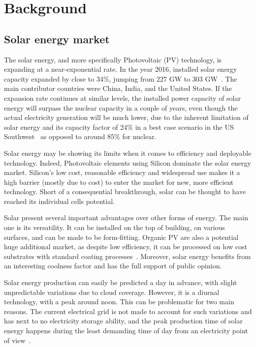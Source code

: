 \documentclass[IJPHM, 2017, 29]{PHMSociety}
\begin{document}
\section{Background}
\label{sec:bkgd}

\subsection{Solar energy market}

The solar energy, and more specifically Photovoltaic (PV) technology, is expanding at a near-exponential rate. In the year 2016, installed solar energy capacity expanded by close to 34\%, jumping from 227 GW to 303 GW~\citep{iea_solar}. The main contributor countries were China, India, and the United States. If the expansion rate continues at similar levels, the installed power capacity of solar energy will surpass the nuclear capacity in a couple of years, even though the actual electricity generation will be much lower, due to the inherent limitation of solar energy and its capacity factor of 24\% in a best case scenario in the US Southwest~\citep{solar_comp} as opposed to around 85\% for nuclear.

Solar energy may be showing its limits when it comes to efficiency and deployable technology. Indeed, Photovoltaic elements using Silicon dominate the solar energy market. Silicon's low cost, reasonable efficiency and widespread use makes it a high barrier (mostly due to cost) to enter the market for new, more efficient technology\citep{oliver1999market,van2007analysis}. Short of a consequential breakthrough, solar can be thought to have reached its individual cells potential.

Solar present several important advantages over other forms of energy. The main one is its versatility. It can be installed on the top of building, on various surfaces, and can be made to be form-fitting. Organic PV are also a potential huge additional market, as despite low efficiency, it can be processed on low cost substrates with standard coating processes~\citep{kalowekamo2009estimating}. Moreover, solar energy benefits from an interesting coolness factor and has the full support of public opinion.

Solar energy production can easily be predicted a day in advance, with slight unpredictable variations due to cloud coverage. However, it is a diurnal technology, with a peak around noon. This can be problematic for two main reasons. The current electrical grid is not made to account for such variations and has next to no electricity storage ability, and the peak production time of solar energy happens during the least demanding time of day from an electricity point of view~\citep{solar_peak}.
\end{document}
